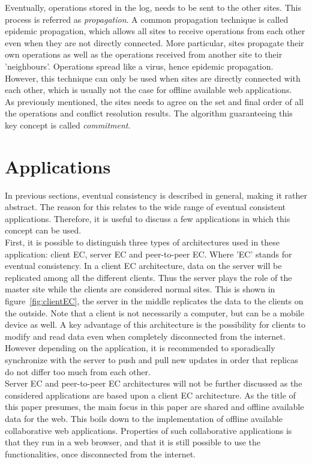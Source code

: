 \documentclass[a4paper,12pt]{report}
\begin{document}
\indent Eventually, operations stored in the log, needs to be sent to the other sites. This process is referred as \textit{propagation}. A common propagation technique is called epidemic propagation, which allows all sites to receive operations from each other even when they are not directly connected. More particular, sites propagate their own operations as well as the operations received from another site to their 'neighbours'. Operations spread like a virus, hence epidemic propagation. However, this technique can only be used when sites are directly connected with each other, which is usually not the case for offline available web applications. \\
\indent As previously mentioned, the sites needs to agree on the set and final order of all the operations and conflict resolution results. The algorithm guaranteeing this key concept is called \textit{commitment}. 

\section{Applications}\label{sec:Applications}

In previous sections, eventual consistency is described in general, making it rather abstract. The reason for this relates to the wide range of eventual consistent applications. Therefore, it is useful to discuss a few applications in which this concept can be used. \\
First, it is possible to distinguish three types of architectures used in these application: client EC, server EC and peer-to-peer EC. Where 'EC' stands for eventual consistency. In a client EC architecture, data on the server will be replicated among all the different clients. Thus the server plays the role of the master site while the clients are considered normal sites. This is shown in figure~\ref{fig:clientEC}, the server in the middle replicates the data to the clients on the outside. Note that a client is not necessarily a computer, but can be a mobile device as well. A key advantage of this architecture is the possibility for clients to modify and read data even when completely disconnected from the internet. However depending on the application, it is recommended to sporadically synchronize with the server to push and pull new updates in order that replicas do not differ too much from each other. \\
Server EC and peer-to-peer EC architectures will not be further discussed as the considered applications are based upon a client EC architecture. As the title of this paper presumes, the main focus in this paper are shared and offline available data for the web. This boils down to the implementation of offline available collaborative web applications. Properties of such collaborative applications is that they run in a web browser, and that it is still possible to use the functionalities, once disconnected from the internet. 
\end{document}

